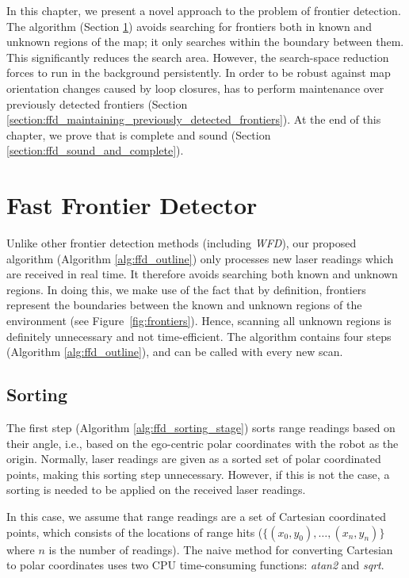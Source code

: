 In this chapter, we present a novel approach to the problem of frontier
detection. The \FFD algorithm (Section \ref{section:ffd}) avoids searching
for frontiers both in known and unknown regions of the map; it only searches
within the boundary between them. This significantly reduces the search area.
However, the search-space reduction forces \FFD to run in the background
persistently. In order to be robust against map orientation changes caused by
loop closures, \FFD has to perform maintenance over previously detected
frontiers (Section
\ref{section:ffd_maintaining_previously_detected_frontiers}). At the end of
this chapter, we prove that \FFD is complete and sound (Section
\ref{section:ffd_sound_and_complete}).

\section{Fast Frontier Detector}
\label{section:ffd}
Unlike other frontier detection methods (including \emph{WFD}), our proposed
algorithm (Algorithm \ref{alg:ffd_outline}) only processes new laser
readings which are received in real time. It therefore avoids searching both
known and unknown regions. In doing this, we make use of the fact that by
definition, frontiers represent the boundaries between the known and unknown
regions of the environment (see Figure~\ref{fig:frontiers}). Hence, scanning all
unknown regions is definitely unnecessary and not time-efficient. The \FFD
algorithm contains four steps (Algorithm \ref{alg:ffd_outline}), and
can be called with every new scan.




  
  \subsection{Sorting} 
	The first step (Algorithm \ref{alg:ffd_sorting_stage}) sorts range readings
	based on their angle, i.e., based on the ego-centric polar coordinates with the robot as the origin.
	Normally, laser readings are given as a sorted set of polar coordinated points, making this
        sorting step unnecessary. However, if this is not the
	case, a sorting is needed to be applied on the received laser readings.
	
	In this case, we assume that range readings are a set of Cartesian coordinated
	points, which consists of the locations of range hits ($ \big\{
	(x_0, y_0), \ldots, (x_n, y_n) \big\}$ where $n$ is the number of readings).
	The naive method for converting Cartesian to polar coordinates
	uses two CPU time-consuming functions: \emph{atan2} and \emph{sqrt}.

